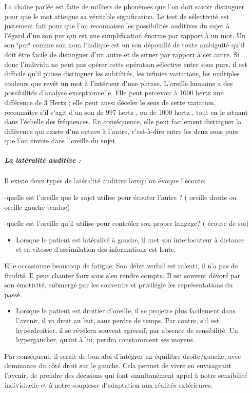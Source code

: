 La chaîne parlée est faite de milliers de phonèmes que l'on doit savoir
distinguer pour que le mot atteigne sa véritable signification. Le
test de sélectivité est justement fait pour que l'on reconnaisse les
possibilités auditives du sujet à l\textquoteright égard d'un son
pur qui est une simplification énorme par rapport à un mot. Un son
\char`\"{}pur\char`\"{} comme son nom l'indique est un son dépouillé
de toute ambiguité qu'il doit être facile de distinguer d'un autre
et de situer par rapport à cet autre. Si donc l\textquoteright individu
ne peut pas opérer cette opération sélective entre sons purs, il est
difficile qu'il puisse distinguer les subtilités, les infinies variations,
les multiples couleurs que revêt un mot à l'intérieur d'une phrase.
L'oreille humaine a des possibilités d'analyse exceptionnelle. Elle
peut percevoir à 1000 hertz une différence de 3 Hertz ; elle peut
aussi déceler le sens de cette variation, reconnaître s'il s'agit
d'un son de 997 hertz , ou de 1000 hertz , tout en le situant dans
l\textquoteright échelle des fréquences. En conséquence, elle peut
facilement distinguer la différence qui existe d'un octave à l'autre,
c'est-à-dire entre les deux sons purs que l'on envoie dans l\textquoteright oreille
du sujet.

\subparagraph{La latéralité auditive : }

Il existe deux types de latéralité auditive lorsqu'on évoque l'écoute:

-quelle est l'oreille que le sujet utilise pour écouter l'autre ?
( oreille droite ou oreille gauche tendue)

-quelle est l'oreille qu'il utilise pour contrôler son propre langage?
( écoute de soi)
\begin{itemize}
\item Lorsque le patient est latéralisé à gauche, il met son interlocuteur
à distance et sa vitesse d'assimilation des informations est lente.
\end{itemize}
Elle occasionne beaucoup de fatigue. Son débit verbal est ralenti,
il n'a pas de fluidité. Il peut chanter faux sans s'en rendre compte.
Il est souvent dévoré par son émotivité, submergé par les souvenirs
et privilégie les représentations du passé.
\begin{itemize}
\item Lorsque le patient est droitier d'oreille, il se projette plus facilement
dans l'avenir, il va droit au but, sans perdre de temps. Par contre,
s'il est hyperdroitier, il se révélera souvent agressif, par absence
de sensibilité. Un hypergaucher, quant à lui, perdra constamment ses
moyens.
\end{itemize}
Par conséquent, il serait de bon aloi d'intégrer un équilibre droite/gauche,
avec dominance du côté droit sur le gauche. Cela permet de vivre en
envisageant l'avenir, de prendre des décisions qui font simultanément
appel à notre sensibilité individuelle et à notre souplesse d'adaptation
aux réalités extérieures.

